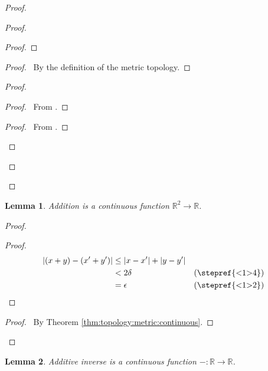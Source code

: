 \documentclass{report}
\let\qed\relax
\newtheorem{lm}{Lemma}[section]
\theoremstyle{definition}
\begin{document}
\begin{proof}
\begin{proof}
\begin{proof}
      \end{proof}
      \begin{proof}
        \pf\ By the definition of the metric topology.
      \end{proof}
      \begin{proof}
        \begin{proof}
          \pf\ From .
        \end{proof}
        \begin{proof}
          \pf\ From .
        \end{proof}
      \end{proof}
    \end{proof}
    \qed
  \end{proof}

  \begin{lm}
    Addition is a continuous function $\mathbb{R}^2 \rightarrow \mathbb{R}$.
  \end{lm}

  \begin{proof}
    \pf
    \begin{proof}
      \pf
      \begin{align*}
        |(x + y) - (x' + y')| & \leq |x - x'| + |y - y'| \\
        & < 2 \delta & (\text{\stepref{<1>4}}) \\
        & = \epsilon & (\text{\stepref{<1>2}})
      \end{align*}
    \end{proof}
    \qedstep
    \begin{proof}
      \pf\ By Theorem \ref{thm:topology:metric:continuous}.
    \end{proof}
    \qed
  \end{proof}

  \begin{lm}
    Additive inverse is a continuous function $- : \mathbb{R} \rightarrow
    \mathbb{R}$.
  \end{lm}
\end{document}
